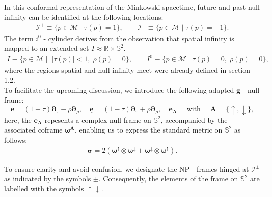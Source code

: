 In this conformal representation of the Minkowski spacetime, future and past null infinity can be identified at the following locations:
\begin{align}
\mathscr{I}^{+} \equiv \{ p \in \mathcal{M} \; \rvert\; \tau(p) =1\}, \qquad \mathscr{I}^{-} \equiv \{ p \in \mathcal{M} \; \rvert \;\tau(p) =-1\}.
\end{align}
The term $i^0$ - cylinder derives from the observation that spatial infinity is mapped to an extended set $I \approx \mathbb{R}\times \mathbb{S}^2$.
\begin{align*}
I \equiv \{ p \in \mathcal{M} \; \rvert \;\; |\tau(p)|<1, \;\rho(p)=0\}, \qquad I^{0} \equiv \{ p \in \mathcal{M}\; \rvert \;\tau(p)=0, \; \rho(p)=0\},
\end{align*}
where the regions spatial and null infinity meet were already defined in section 1.2.\\
To facilitate the upcoming discussion, we introduce the following adapted $\boldsymbol{g}$ - null frame:
\begin{equation}\label{eq:Fframe}
\boldsymbol{e}=(1+\tau) \boldsymbol{\partial}_\tau-\rho \boldsymbol{\partial}_\rho, \quad \underline{\boldsymbol{e}}=(1-\tau) \boldsymbol{\partial}_\tau+\rho \boldsymbol{\partial}_\rho, \quad \boldsymbol{e}_{\boldsymbol{A}} \quad \text { with } \quad \boldsymbol{A}=\{\uparrow, \downarrow\},
\end{equation}
here, the $\boldsymbol{e}_{\boldsymbol{A}}$ repesents a complex null frame on $\mathbb{S}^2$, accompanied by the associated coframe $\boldsymbol{\omega}^{\boldsymbol{A}}$, enabling us to express the standard metric on $\mathbb{S}^2$ as follows:
\begin{align}
\bm\sigma=2(\bm\omega^{\uparrow}\otimes \bm\omega^{\downarrow}+\bm\omega^{\downarrow}\otimes \bm\omega^{\uparrow}).
\end{align}
\begin{remark}
  To ensure clarity and avoid confusion, we designate the NP - frames hinged at $\mathscr{I}^{\pm}$ as indicated by the symbols $\pm$. Consequently, the elements of the frame on $\mathbb{S}^2$ are labelled with the symbols $\uparrow \downarrow$.
\end{remark}

